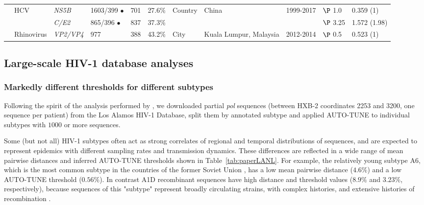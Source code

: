 \documentclass[utf8]{FrontiersinHarvard} %
\begin{document}
\begin{table}[h]
\begin{ssmall}
\begin{tabular}{lllllllllll}
			\cite{Ye:2023aa}        & HCV        & {\it NS5B}    & 1603/399 $\bullet$ & 701        & 27.6\%                               & Country  & China                  & 1999-2017 & $\P$ 1.0                                   & 0.359 (1)         \\
			                        &            & {\it C/E2}    & 865/396 $\bullet$  & 837        & 37.3\%                               &          &                        &           & $\P$ 3.25                                  & 1.572 (1.98)      \\
			\cite{Ng:2022aa}        & Rhinovirus & {\it VP2/VP4} & 977                & 388        & 43.2\%                               & City     & Kuala Lumpur, Malaysia & 2012-2014 & $\P$ 0.5                                   & 0.523 (1)         \\

			\hline
		\end{tabular}
	\end{ssmall}
\end{table}

\subsection{Large-scale HIV-1 database analyses}

\subsubsection{Markedly different thresholds for different subtypes}
Following the spirit of the analysis performed by \citet{Wertheim:2014aa}, we
downloaded partial {\it pol} sequences (between HXB-2 coordinates 2253 and
3200, one sequence per patient) from the Los Alamos HIV-1 Database, split them
by annotated subtype and applied AUTO-TUNE to individual subtypes with $1000$
or more sequences.

Some (but not all) HIV-1 subtypes often act as strong correlates of regional and
temporal distributions of sequences, and are expected to represent epidemics
with different sampling rates and transmission dynamics. These differences are
reflected in a wide range of mean pairwise distances and inferred AUTO-TUNE
thresholds shown in Table~\ref{tab:paperLANL}. For example, the relatively
young subtype A6, which is the most common subtype in the countries of the
former Soviet Union \cite{Abidi:2021aa}, has a low mean pairwise distance
($4.6\%$) and a low AUTO-TUNE threshold ($0.56\%$). In contrast A1D recombinant
sequences have high distance and threshold values ($8.9\%$ and $3.23\%$,
respectively), because sequences of this "subtype" represent broadly
circulating strains, with complex histories, and extensive histories of
recombination \cite{Foster:2014aa,Yebra:2015aa}.
\end{document}
